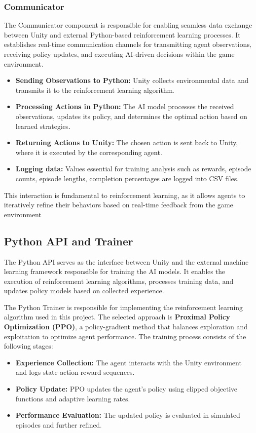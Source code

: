 \documentclass[12pt,oneside,openright,a4paper]{cpe-english-project}
\begin{document}
\subsubsection{Communicator}
The Communicator component is responsible for enabling seamless data exchange between Unity and external Python-based reinforcement learning processes. It establishes real-time communication channels for transmitting agent observations, receiving policy updates, and executing AI-driven decisions within the game environment.
\begin{itemize}
\item  \textbf{Sending Observations to Python:} Unity collects environmental data and transmits it to the reinforcement learning algorithm.
\item  \textbf{Processing Actions in Python:} The AI model processes the received observations, updates its policy, and determines the optimal action based on learned strategies.
\item  \textbf{Returning Actions to Unity:} The chosen action is sent back to Unity, where it is executed by the corresponding agent.
\item  \textbf{Logging data:} Values essential for training analysis such as rewards, episode counts, episode lengths, completion percentages are logged into CSV files.
\end{itemize}
This interaction is fundamental to reinforcement learning, as it allows agents to iteratively refine their behaviors based on real-time feedback from the game environment

\subsection{Python API and Trainer}
The Python API serves as the interface between Unity and the external machine learning framework responsible for training the AI models. It enables the execution of reinforcement learning algorithms, processes training data, and updates policy models based on collected experience.\par
The Python Trainer is responsible for implementing the reinforcement learning algorithm used in this project. The selected approach is \textbf{Proximal Policy Optimization (PPO)}, a policy-gradient method that balances exploration and exploitation to optimize agent performance. The training process consists of the following stages:
\begin{itemize}
\item \textbf{Experience Collection:} The agent interacts with the Unity environment and logs state-action-reward sequences.
\item \textbf{Policy Update:} PPO updates the agent’s policy using clipped objective functions and adaptive learning rates.
\item \textbf{Performance Evaluation:} The updated policy is evaluated in simulated episodes and further refined.
\end{itemize}
\end{document}
